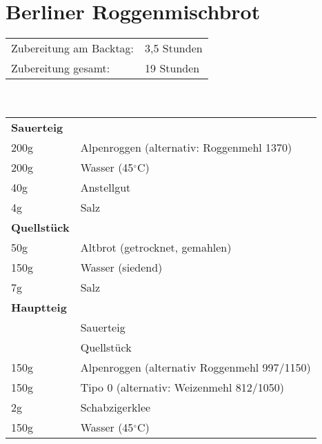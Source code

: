 \section{Berliner Roggenmischbrot}
\begin{tabular}{ll}
    Zubereitung am Backtag: & 3,5 Stunden \\
    Zubereitung gesamt:     & 19 Stunden
\end{tabular}\\

\paragraph{}
\begin{tabular}{ll}
    \textbf{Sauerteig} \\
    200g & Alpenroggen (alternativ: Roggenmehl 1370)    \\
    200g & Wasser (45$^\circ$C)                         \\
    40g  & Anstellgut                                   \\
    4g   & Salz                                         \\
    \textbf{Quellstück} \\
    50g  & Altbrot (getrocknet, gemahlen)               \\
    150g & Wasser (siedend)                             \\
    7g   & Salz                                         \\
    \textbf{Hauptteig} \\
    & Sauerteig                                    \\
    & Quellstück                                   \\
    150g & Alpenroggen (alternativ Roggenmehl 997/1150) \\
    150g & Tipo 0 (alternativ: Weizenmehl 812/1050)     \\
    2g   & Schabzigerklee                               \\
    150g & Wasser (45$^\circ$C)                         \\
\end{tabular}\\

